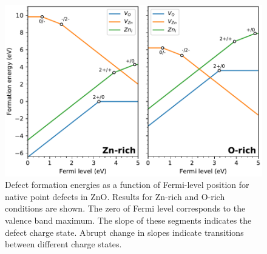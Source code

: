 \begin{figure}[tbh!]
	\centering
	\includegraphics[width=0.65\linewidth]{"images/rnd/defect-formation"}
	\caption[Defect formation energies as a function of Fermi-level position for native point defects in ZnO]{Defect formation energies as a function of Fermi-level position for native point defects in ZnO. Results for Zn-rich and O-rich conditions are shown. The zero of Fermi level corresponds to the valence band maximum. The slope of these segments indicates the defect charge state. Abrupt change in slopes indicate transitions between different charge states.}
	\label{fig:defect-formE}
\end{figure}

